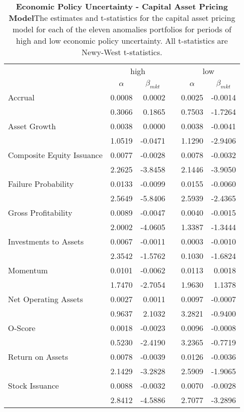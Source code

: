 \begin{table}[htbp]
\centering
\scriptsize
\caption[EPU - Capital Asset Pricing Model]{\textbf{Economic Policy Uncertainty - Capital Asset Pricing Model}\newline The estimates and t-statistics for the capital asset pricing model for each of the eleven anomalies portfolios for periods of high and low economic policy uncertainty.  All t-statistics are Newy-West t-statistics.}
\begin{tabular}{lrrrrr}
\toprule
& \multicolumn{2}{c}{high} &       & \multicolumn{2}{c}{low} \\
\cmidrule{2-3}\cmidrule{5-6}          & \multicolumn{1}{c}{$\alpha$} & \multicolumn{1}{c}{$\beta_{mkt}$} &       & \multicolumn{1}{c}{$\alpha$} & \multicolumn{1}{c}{$\beta_{mkt}$} \\
\midrule
Accrual & 0.0008 & 0.0002 &       & 0.0025 & -0.0014 \\
& 0.3066 & 0.1865 &       & 0.7503 & -1.7264 \\
Asset Growth & 0.0038 & 0.0000 &       & 0.0038 & -0.0041 \\
& 1.0519 & -0.0471 &       & 1.1290 & -2.9406 \\
Composite Equity Issuance & 0.0077 & -0.0028 &       & 0.0078 & -0.0032 \\
& 2.2625 & -3.8458 &       & 2.1446 & -3.9050 \\
Failure Probability & 0.0133 & -0.0099 &       & 0.0155 & -0.0060 \\
& 2.5649 & -5.8406 &       & 2.5939 & -2.4365 \\
Gross Profitability & 0.0089 & -0.0047 &       & 0.0040 & -0.0015 \\
& 2.0002 & -4.0605 &       & 1.3387 & -1.3444 \\
Investments to Assets & 0.0067 & -0.0011 &       & 0.0003 & -0.0010 \\
& 2.3542 & -1.5762 &       & 0.1030 & -1.6824 \\
Momentum & 0.0101 & -0.0062 &       & 0.0113 & 0.0018 \\
& 1.7470 & -2.7054 &       & 1.9630 & 1.1378 \\
Net Operating Assets & 0.0027 & 0.0011 &       & 0.0097 & -0.0007 \\
& 0.9637 & 2.1032 &       & 3.2821 & -0.9400 \\
O-Score & 0.0018 & -0.0023 &       & 0.0096 & -0.0008 \\
& 0.5230 & -2.4190 &       & 3.2365 & -0.7719 \\
Return on Assets & 0.0078 & -0.0039 &       & 0.0126 & -0.0036 \\
& 2.1429 & -3.2828 &       & 2.5909 & -1.9065 \\
Stock Issuance & 0.0088 & -0.0032 &       & 0.0070 & -0.0028 \\
& 2.8412 & -4.5886 &       & 2.7077 & -3.2896 \\
\bottomrule
\end{tabular}%
\label{tab:epu-capm}%
\end{table}%

